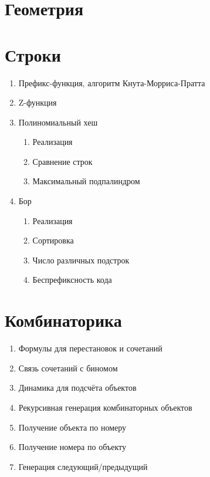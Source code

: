 \documentclass[a4paper,12pt]{article}
\begin{document}
  \section{Геометрия}

  \section{Строки}
    \begin{enumerate}
      \item Префикс-функция, алгоритм Кнута-Морриса-Пратта
      \item Z-функция
      \item Полиномиальный хеш
        \begin{enumerate}
          \item Реализация
          \item Сравнение строк
          \item Максимальный подпалиндром
        \end{enumerate}
      \item Бор
        \begin{enumerate}
          \item Реализация
          \item Сортировка
          \item Число различных подстрок
          \item Беспрефиксность кода
        \end{enumerate}
    \end{enumerate}

  \section{Комбинаторика}
    \begin{enumerate}
      \item Формулы для перестановок и сочетаний
      \item Связь сочетаний с биномом
      \item Динамика для подсчёта объектов
      \item Рекурсивная генерация комбинаторных объектов 
      \item Получение объекта по номеру 
      \item Получение номера по объекту 
      \item Генерация следующий/предыдущий
    \end{enumerate}
\end{document}
